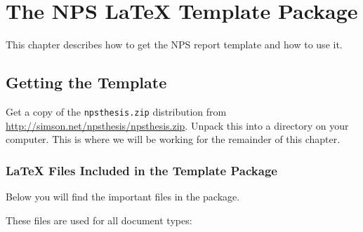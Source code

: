 \chapter{The NPS \LaTeX{} Template Package}
This chapter describes how to get the NPS report template and how to
use it.

\section{Getting the Template}
Get a copy of the \texttt{npsthesis.zip} distribution from
\url{http://simson.net/npsthesis/npsthesis.zip}. Unpack this into a
directory on your computer. This is where we will be working for the
remainder of this chapter.

\subsection{\LaTeX{} Files Included in the Template Package}

Below you will find the important files in the package.

These files are used for all document types:


